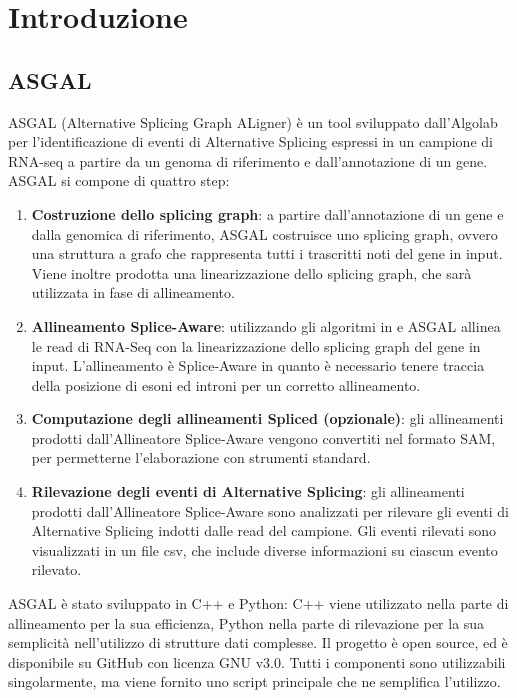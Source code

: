 \section{Introduzione}

\subsection{ASGAL}
ASGAL (Alternative Splicing Graph ALigner) \cite{ASGAL} è un tool sviluppato dall'Algolab per l'identificazione di eventi di Alternative Splicing espressi in un campione di RNA-seq a partire da un genoma di riferimento e dall'annotazione di un gene. ASGAL si compone di quattro step:

\begin{enumerate}
	\item \textbf{Costruzione dello splicing graph}: a partire dall'annotazione di un gene e dalla genomica di riferimento, ASGAL costruisce uno splicing graph, ovvero una struttura a grafo che rappresenta tutti i trascritti noti del gene in input. Viene inoltre prodotta una linearizzazione dello splicing graph, che sarà utilizzata in fase di allineamento.
	\item \textbf{Allineamento Splice-Aware}: utilizzando gli algoritmi in \cite{MEM} e \cite{MEMAlgo} ASGAL allinea le read di RNA-Seq con la linearizzazione dello splicing graph del gene in input. L'allineamento è Splice-Aware in quanto è necessario tenere traccia della posizione di esoni ed introni per un corretto allineamento.
	\item \textbf{Computazione degli allineamenti Spliced (opzionale)}: gli allineamenti prodotti dall'Allineatore Splice-Aware vengono convertiti nel formato SAM, per permetterne l'elaborazione con strumenti standard.
	\item \textbf{Rilevazione degli eventi di Alternative Splicing}: gli allineamenti prodotti dall'Allineatore Splice-Aware sono analizzati per rilevare gli eventi di Alternative Splicing indotti dalle read del campione. Gli eventi rilevati sono visualizzati in un file csv, che include diverse informazioni su ciascun evento rilevato.
\end{enumerate}

ASGAL è stato sviluppato in C++ e Python: C++ viene utilizzato nella parte di allineamento per la sua efficienza, Python nella parte di rilevazione per la sua semplicità nell'utilizzo di strutture dati complesse. Il progetto è open source, ed è disponibile su GitHub con licenza GNU v3.0. Tutti i componenti sono utilizzabili singolarmente, ma viene fornito uno script principale che ne semplifica l'utilizzo.  

